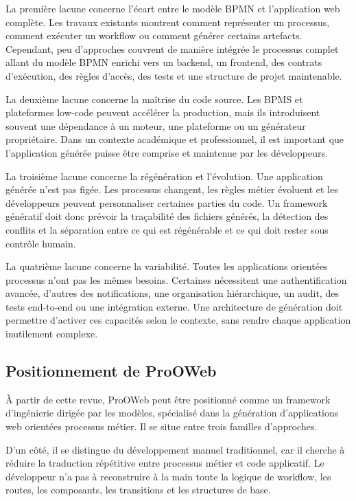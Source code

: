 \documentclass[12pt,a4paper]{article}
\begin{document}
La première lacune concerne l'écart entre le modèle BPMN et l'application web complète. Les travaux existants montrent comment représenter un processus, comment exécuter un workflow ou comment générer certains artefacts. Cependant, peu d'approches couvrent de manière intégrée le processus complet allant du modèle BPMN enrichi vers un backend, un frontend, des contrats d'exécution, des règles d'accès, des tests et une structure de projet maintenable.

La deuxième lacune concerne la maîtrise du code source. Les BPMS et plateformes low-code peuvent accélérer la production, mais ils introduisent souvent une dépendance à un moteur, une plateforme ou un générateur propriétaire. Dans un contexte académique et professionnel, il est important que l'application générée puisse être comprise et maintenue par les développeurs.

La troisième lacune concerne la régénération et l'évolution. Une application générée n'est pas figée. Les processus changent, les règles métier évoluent et les développeurs peuvent personnaliser certaines parties du code. Un framework génératif doit donc prévoir la traçabilité des fichiers générés, la détection des conflits et la séparation entre ce qui est régénérable et ce qui doit rester sous contrôle humain.

La quatrième lacune concerne la variabilité. Toutes les applications orientées processus n'ont pas les mêmes besoins. Certaines nécessitent une authentification avancée, d'autres des notifications, une organisation hiérarchique, un audit, des tests end-to-end ou une intégration externe. Une architecture de génération doit permettre d'activer ces capacités selon le contexte, sans rendre chaque application inutilement complexe.

\subsection{Positionnement de ProOWeb}

À partir de cette revue, ProOWeb peut être positionné comme un framework d'ingénierie dirigée par les modèles, spécialisé dans la génération d'applications web orientées processus métier. Il se situe entre trois familles d'approches.

D'un côté, il se distingue du développement manuel traditionnel, car il cherche à réduire la traduction répétitive entre processus métier et code applicatif. Le développeur n'a pas à reconstruire à la main toute la logique de workflow, les routes, les composants, les transitions et les structures de base.
\end{document}
